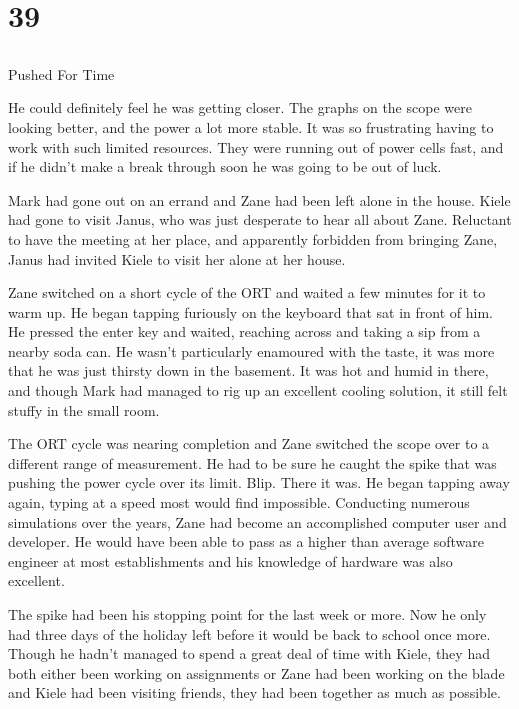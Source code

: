 \chapter{39}
\section{}
Pushed For Time  

He could definitely feel he was getting closer.  The graphs on the scope were looking better, and the power a lot more stable.  It was so frustrating having to work with such limited resources.  They were running out of power cells fast, and if he didn't make a break through soon he was going to be out of luck.  

Mark had gone out on an errand and Zane had been left alone in the house.  Kiele had gone to visit Janus, who was just desperate to hear all about Zane.  Reluctant to have the meeting at her place, and apparently forbidden from bringing Zane, Janus had invited Kiele to visit her alone at her house.

Zane switched on a short cycle of the ORT and waited a few minutes for it to warm up.  He began tapping furiously on the keyboard that sat in front of him.  He pressed the enter key and waited, reaching across and taking a sip from a nearby soda can.  He wasn't particularly enamoured with the taste, it was more that he was just thirsty down in the basement.  It was hot and humid in there, and though Mark had managed to rig up an excellent cooling solution, it still felt stuffy in the small room.

The ORT cycle was nearing completion and Zane switched the scope over to a different range of measurement.  He had to be sure he caught the spike that was pushing the power cycle over its limit.  Blip.  There it was.  He began tapping away again, typing at a speed most would find impossible.  Conducting numerous simulations over the years, Zane had become an accomplished computer user and developer.  He would have been able to pass as a higher than average software engineer at most establishments and his knowledge of hardware was also excellent.  

The spike had been his stopping point for the last week or more.  Now he only had three days of the holiday left before it would be back to school once more.  Though he hadn't managed to spend a great deal of time with Kiele, they had both either been working on assignments or Zane had been working on the blade and Kiele had been visiting friends, they had been together as much as possible.

